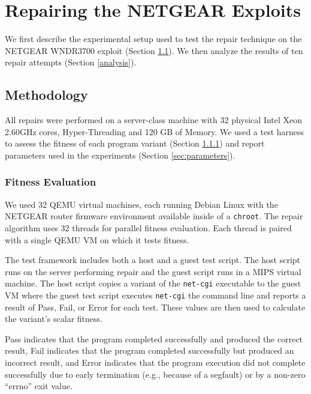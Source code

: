 \documentclass{sigcomm-alternate}
\begin{document}
\section{Repairing the NETGEAR Exploits}
\label{repair-demonstration}

We first describe the experimental setup used to test the
repair technique on the NETGEAR WNDR3700 exploit (Section
\ref{methodology}).  We then analyze the results of ten repair
attempts (Section \ref{analysis}).

\subsection{Methodology}
\label{methodology}
All repairs were performed on a server-class machine with 32 physical
Intel Xeon 2.60GHz cores, Hyper-Threading and 120 GB of Memory. We
used a test harness to assess the fitness of each program variant
(Section \ref{fitness-evaluation}) and report parameters used in the
experiments (Section \ref{sec:parameters}).

\subsubsection{Fitness Evaluation}
\label{fitness-evaluation}
We used 32 QEMU virtual machines, each
running Debian Linux with the NETGEAR router firmware environment
available inside of a \texttt{chroot}.  The repair algorithm
uses 32 threads for parallel fitness evaluation.  Each thread is
paired with a single QEMU VM on which it tests fitness.

The test framework includes both a host and a guest test script.  The
host script runs on the server performing repair and the guest script
runs in a MIPS virtual machine.  The host script copies a
variant of the \texttt{net-cgi} executable to the guest VM where the
guest test script executes \texttt{net-cgi} the command line and
reports a result of {\sc Pass}, {\sc Fail}, or {\sc Error} for each
test.  These values are then used to calculate the variant's scalar
fitness.

{\sc Pass} indicates that the program completed successfully and
produced the correct result, {\sc Fail} indicates that the program
completed successfully but produced an incorrect result, and {\sc
  Error} indicates that the program execution did not complete
successfully due to early termination (e.g., because of a segfault) or
by a non-zero ``errno'' exit value.
\end{document}
